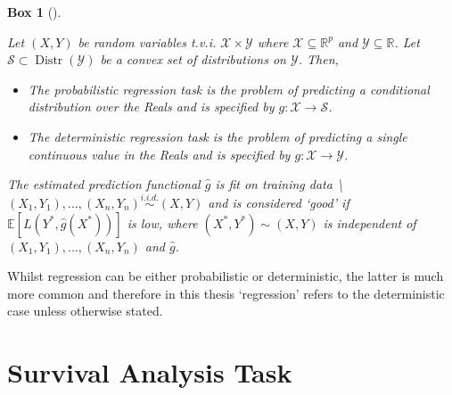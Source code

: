 \documentclass[
  letterpaper,
]{scrbook}
\providecommand{\tightlist}{%
  \setlength{\itemsep}{0pt}\setlength{\parskip}{0pt}}\usepackage{longtable,booktabs,array}
\theoremstyle{plain}
\newtheorem{conjecture}{Box}[chapter]
\theoremstyle{definition}
\theoremstyle{remark}
\begin{document}
\begin{tcolorbox}[enhanced jigsaw, title={Regression Task}, breakable, leftrule=.75mm, rightrule=.15mm, opacityback=0, coltitle=black, colback=white, toptitle=1mm, toprule=.15mm, bottomtitle=1mm, titlerule=0mm, arc=.35mm, bottomrule=.15mm, colbacktitle=quarto-callout-note-color!10!white, left=2mm, opacitybacktitle=0.6, colframe=quarto-callout-note-color-frame]

\leavevmode{}%
\begin{conjecture}[]\label{cnj-task-regr}

Let \((X,Y)\) be random variables t.v.i.
\(\mathcal{X}\times \mathcal{Y}\) where
\(\mathcal{X}\subseteq \mathbb{R}^p\) and
\(\mathcal{Y}\subseteq \mathbb{R}\). Let
\(\mathcal{S}\subset \operatorname{Distr}(\mathcal{Y})\) be a convex set
of distributions on \(\mathcal{Y}\). Then,

\begin{itemize}
\tightlist
\item
  The \emph{probabilistic regression task} is the problem of predicting
  a conditional distribution over the Reals and is specified by
  \(g : \mathcal{X}\rightarrow \mathcal{S}\).
\item
  The \emph{deterministic regression task} is the problem of predicting
  a single continuous value in the Reals and is specified by
  \(g: \mathcal{X}\rightarrow \mathcal{Y}\).
\end{itemize}

The estimated prediction functional \(\hat{g}\) is fit on training data
\textbackslash{}\((X_1,Y_1),...,(X_n,Y_n) \stackrel{i.i.d.}\sim(X,Y)\)
and is considered `good' if \(\mathbb{E}[L(Y^*, \hat{g}(X^*))]\) is low,
where \((X^*, Y^*) \sim (X, Y)\) is independent of
\((X_1,Y_1),...,(X_n,Y_n)\) and \(\hat{g}\).

\end{conjecture}

\end{tcolorbox}

Whilst regression can be either probabilistic or deterministic, the
latter is much more common and therefore in this thesis `regression'
refers to the deterministic case unless otherwise stated.

\section{Survival Analysis Task}
\label{sec:surv_setmltask}
\end{document}
